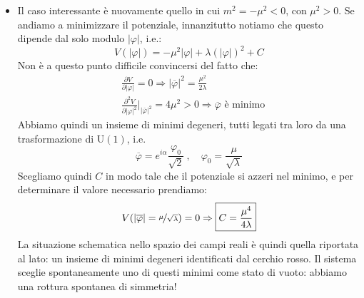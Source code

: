 \documentclass[../main.tex]{subfiles}
\begin{document}
\begin{itemize}
    \item Il caso interessante è nuovamente quello in cui $m^2=-\mu^2<0$, con $\mu^2>0$. Se andiamo a minimizzare il potenziale, innanzitutto notiamo che questo dipende dal solo modulo $|\varphi|$, i.e.:
    \[
    V(|\varphi|) = -\mu^2|\varphi| + \lambda(|\varphi|)^2 + C
    \]
    Non è a questo punto difficile convincersi del fatto che:
    \begin{align*}
        &\frac{\partial V}{\partial |\varphi|} = 0 \Rightarrow |\overline{\varphi}|^2 = \frac{\mu^2}{2\lambda}\\
        &\frac{\partial^2 V}{\partial |\varphi|^2}\bigg|_{|\overline{\varphi}|^2} = 4\mu^2>0 \Rightarrow \overline{\varphi} \text{ è minimo}
    \end{align*}
    Abbiamo quindi un insieme di minimi degeneri, tutti legati tra loro da una trasformazione di $\textrm{U}(1)$, i.e.
    \[
    \boxed{\overline{\varphi} = e^{i\alpha}\frac{\varphi_0}{\sqrt{2}}~,\quad \varphi_0 = \frac{\mu}{\sqrt{\lambda}}}
    \]
    Scegliamo quindi $C$ in modo tale che il potenziale si azzeri nel minimo, e per determinare il valore necessario prendiamo:
    \[
    V(|\overline{\varphi}| = \nicefrac{\mu}{\sqrt{\lambda}}) = 0 \Rightarrow \boxed{C= \frac{\mu^4}{4\lambda}}
    \]
    La situazione schematica nello spazio dei campi reali è quindi quella riportata al lato: un insieme di minimi degeneri identificati dal cerchio rosso. Il sistema sceglie spontaneamente uno di questi minimi come stato di vuoto: abbiamo una rottura spontanea di simmetria!
\end{itemize}
\end{document}

